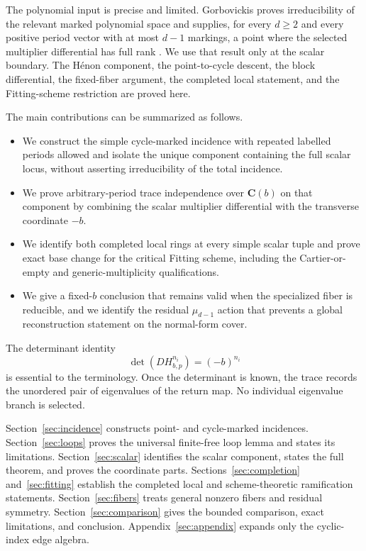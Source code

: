 \documentclass[11pt]{article}
\theoremstyle{definition}
\theoremstyle{remark}
\newcommand{\C}{\mathbf C}
\begin{document}
The polynomial input is precise and limited.  Gorbovickis proves
irreducibility of the relevant marked polynomial space and supplies, for
every $d\geq2$ and every positive period vector with at most $d-1$ markings,
a point where the selected multiplier differential has full rank
\cite[Definition~1.3, Remark~1.4, Lemma~1.5, Theorem~1.6, and
Lemma~2.1]{Gor13}.  We use that result only at the scalar boundary.  The
Hénon component, the point-to-cycle descent, the block differential, the
fixed-fiber argument, the completed local statement, and the Fitting-scheme
restriction are proved here.

The main contributions can be summarized as follows.
\begin{itemize}[leftmargin=2em]
  \item We construct the simple cycle-marked incidence with repeated
  labelled periods allowed and isolate the unique component containing the
  full scalar locus, without asserting irreducibility of the total incidence.
  \item We prove arbitrary-period trace independence over $\C(b)$ on that
  component by combining the scalar multiplier differential with the
  transverse coordinate $-b$.
  \item We identify both completed local rings at every simple scalar tuple
  and prove exact base change for the critical Fitting scheme, including the
  Cartier-or-empty and generic-multiplicity qualifications.
  \item We give a fixed-$b$ conclusion that remains valid when the specialized
  fiber is reducible, and we identify the residual $\mu_{d-1}$ action that
  prevents a global reconstruction statement on the normal-form cover.
\end{itemize}

The determinant identity
\[
  \det(DH_{b,p}^{n_i})=(-b)^{n_i}
\]
is essential to the terminology.  Once the determinant is known, the trace
records the unordered pair of eigenvalues of the return map.  No individual
eigenvalue branch is selected.

Section~\ref{sec:incidence} constructs point- and cycle-marked incidences.
Section~\ref{sec:loops} proves the universal finite-free loop lemma and
states its limitations.  Section~\ref{sec:scalar} identifies the scalar
component, states the full theorem, and proves the coordinate parts.
Sections~\ref{sec:completion} and~\ref{sec:fitting} establish the completed
local and scheme-theoretic ramification statements.
Section~\ref{sec:fibers} treats general nonzero fibers and residual symmetry.
Section~\ref{sec:comparison} gives the bounded comparison, exact limitations,
and conclusion.  Appendix~\ref{sec:appendix} expands only the cyclic-index
edge algebra.
\end{document}
